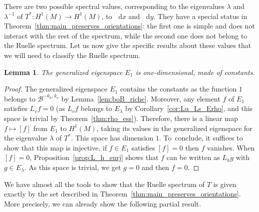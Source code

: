 \documentclass[10pt]{amsart}
\newcommand{\boB}{\mathcal{B}}
\newcommand{\dd}{\mathop{}\!\mathrm{d}}
\newtheorem{lem}[thm]{Lemma}
\theoremstyle{definition}
\numberwithin{equation}{section}
\begin{document}
There are two possible spectral values, corresponding to the eigenvalues
$\lambda$ and~$\lambda^{-1}$ of $T^*: H^1(M) \to H^1(M)$, \ie to $\dd x$
and $\dd y$. They have a special status in
Theorem~\ref{thm:main_preserves_orientations}: the first one is simple and
does not interact with the rest of the spectrum, while the second one does
not belong to the Ruelle spectrum. Let us now give the specific results about
these values that we will need to classify the Ruelle spectrum.

\begin{lem}
\label{lem:E1} The generalized eigenspace $E_1$ is one-dimensional, made of
constants.
\end{lem}
\begin{proof}
The generalized eigenspace $E_1$ contains the constants as the function $1$
belongs to $\boB^{-k_h, k_v}$ by Lemma~\ref{lem:boB_riche}. Moreover, any
element $f$ of $E_1$ satisfies $L_v f = 0$ (as $L_v f$ belongs to
$E_{\lambda}$ by Corollary~\ref{cor:Lu_Ls_Erho}, and this space is trivial
by Theorem~\ref{thm:rho_ess}). Therefore, there is a linear map $f \mapsto
[f]$ from $E_1$ to $H^1(M)$, taking its values in the generalized eigenspace
for the eigenvalue $\lambda$ of $T^*$. This space has dimension $1$. To~conclude, it suffices to show that this map is injective, \ie if $f\in E_1$
satisfies $[f] = 0$ then $f$ vanishes. When $[f] = 0$,
Proposition~\ref{prop:L_h_surj} shows that $f$ can be written as $L_h g$ with
$g \in E_{\lambda}$. As this space is trivial, we get $g=0$ and then $f=0$.
\end{proof}

We have almost all the tools to show that the Ruelle spectrum of $T$ is given
exactly by the set described in
Theorem~\ref{thm:main_preserves_orientations}. More precisely, we can already
show the following partial result.
\end{document}
